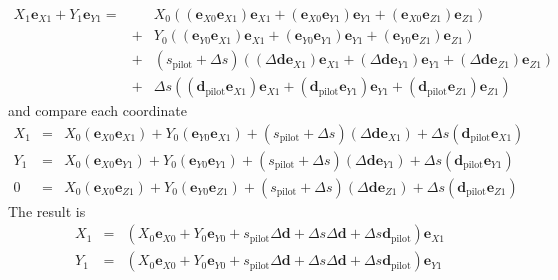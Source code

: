 \documentclass[12pt,a4paper,twoside,openright,BCOR10mm,headsepline,titlepage,abstracton,chapterprefix,final]{scrreprt}
\newcommand\Vector[1]{{\mathbf{#1}}}
\begin{document}
\begin{eqnarray}
  X_1 \Vector{e}_{X1} + Y_1 \Vector{e}_{Y1} 
  =&& 
      X_0 ( (\Vector{e}_{X0} \Vector{e}_{X1}) \Vector{e}_{X1} + (\Vector{e}_{X0} \Vector{e}_{Y1}) \Vector{e}_{Y1} + (\Vector{e}_{X0} \Vector{e}_{Z1} ) \Vector{e}_{Z1}) \nonumber \\
  &+& Y_0 ( (\Vector{e}_{Y0} \Vector{e}_{X1}) \Vector{e}_{X1} + (\Vector{e}_{Y0} \Vector{e}_{Y1}) \Vector{e}_{Y1} + (\Vector{e}_{Y0} \Vector{e}_{Z1} ) \Vector{e}_{Z1}) \nonumber \\  
  &+& (s_{\text{pilot}}+ \Delta s )( (\Delta \Vector{d} \Vector{e}_{X1}) \Vector{e}_{X1} + (\Delta \Vector{d} \Vector{e}_{Y1}) \Vector{e}_{Y1} + (\Delta \Vector{d} \Vector{e}_{Z1} ) \Vector{e}_{Z1}) \nonumber \\  
  &+& \Delta s ( (\Vector{d}_{\text{pilot}} \Vector{e}_{X1}) \Vector{e}_{X1} + (\Vector{d}_{\text{pilot}} \Vector{e}_{Y1}) \Vector{e}_{Y1} + (\Vector{d}_{\text{pilot}} \Vector{e}_{Z1} ) \Vector{e}_{Z1})  
\end{eqnarray}
and compare each coordinate
\begin{eqnarray}
  X_1 &=& X_0 (\Vector{e}_{X0} \Vector{e}_{X1}) + Y_0 (\Vector{e}_{Y0} \Vector{e}_{X1}) + (s_{\text{pilot}}+ \Delta s )(\Delta \Vector{d} \Vector{e}_{X1}) + \Delta s (\Vector{d}_{\text{pilot}} \Vector{e}_{X1}) \\
  Y_1 &=& X_0 (\Vector{e}_{X0} \Vector{e}_{Y1}) + Y_0 (\Vector{e}_{Y0} \Vector{e}_{Y1}) + (s_{\text{pilot}}+ \Delta s )(\Delta \Vector{d} \Vector{e}_{Y1}) + \Delta s (\Vector{d}_{\text{pilot}} \Vector{e}_{Y1}) \\
  0   &=& X_0 (\Vector{e}_{X0} \Vector{e}_{Z1}) + Y_0 (\Vector{e}_{Y0} \Vector{e}_{Z1}) + (s_{\text{pilot}}+ \Delta s )(\Delta \Vector{d} \Vector{e}_{Z1}) + \Delta s (\Vector{d}_{\text{pilot}} \Vector{e}_{Z1} )
\end{eqnarray}
The result is
\begin{subequations}\label{eq:propagation_between_planes_exact_formula}
\begin{eqnarray}
  X_1      &=& \left( X_0 \Vector{e}_{X0} + Y_0 \Vector{e}_{Y0} + s_{\text{pilot}}\Delta \Vector{d} + \Delta s \Delta \Vector{d} + \Delta s \Vector{d}_{\text{pilot}} \right) \Vector{e}_{X1} 
  \\
  Y_1      &=& \left( X_0 \Vector{e}_{X0} + Y_0 \Vector{e}_{Y0} + s_{\text{pilot}}\Delta \Vector{d} + \Delta s \Delta \Vector{d} + \Delta s \Vector{d}_{\text{pilot}} \right) \Vector{e}_{Y1} 
\end{eqnarray}
\end{subequations}
\end{document}

